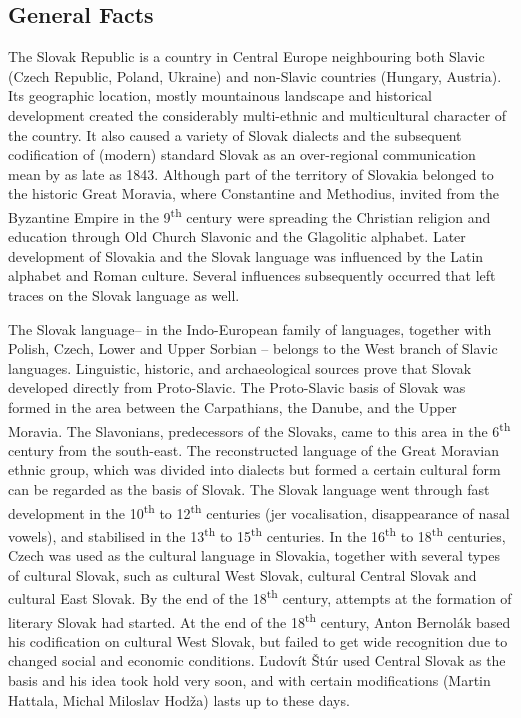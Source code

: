 \begin{multicols}{2}
\subsection{General Facts}
The Slovak Republic is a country in Central Europe neighbouring both Slavic (Czech Republic, Poland, Ukraine) and non-Slavic countries (Hungary, Austria). Its geographic location, mostly mountainous landscape and historical development created the considerably multi-ethnic and multicultural character of the country. It also caused a variety of Slovak dialects and the subsequent codification of (modern) standard Slovak as an over-regional communication mean by as late as 1843. Although part of the territory of Slovakia belonged to the historic Great Moravia, where Constantine and Methodius, invited from the Byzantine Empire in the 9\textsuperscript{th} century were spreading the Christian religion and education through Old Church Slavonic and the Glagolitic alphabet. Later development of Slovakia and the Slovak language was influenced by the Latin alphabet and Roman culture. Several influences subsequently occurred that left traces on the Slovak language as well.

The Slovak language– in the Indo-European family of languages, together with Polish, Czech, Lower and Upper Sorbian – belongs to the West branch of Slavic languages. Linguistic, historic, and archaeological sources prove that Slovak developed directly from Proto-Slavic. The Proto-Slavic basis of Slovak was formed in the area between the Carpathians, the Danube, and the Upper Moravia. The Slavonians, predecessors of the Slovaks, came to this area in the 6\textsuperscript{th} century from the south-east. The reconstructed language of the Great Moravian ethnic group, which was divided into dialects but formed a certain cultural form can be regarded as the basis of Slovak. The Slovak language went through fast development in the 10\textsuperscript{th} to 12\textsuperscript{th} centuries (jer vocalisation, disappearance of nasal vowels), and stabilised in the 13\textsuperscript{th} to 15\textsuperscript{th} centuries. In the 16\textsuperscript{th} to 18\textsuperscript{th} centuries, Czech was used as the cultural language in Slovakia, together with several types of cultural Slovak, such as cultural West Slovak, cultural Central Slovak and cultural East Slovak. By the end of the 18\textsuperscript{th} century, attempts at the formation of literary Slovak had started. At the end of the 18\textsuperscript{th} century, Anton Bernolák based his codification on cultural West Slovak, but failed to get wide recognition due to changed social and economic conditions. Ľudovít Štúr used Central Slovak as the basis and his idea took hold very soon, and with certain modifications (Martin Hattala, Michal Miloslav Hodža) lasts up to these days.


\end{multicols}

